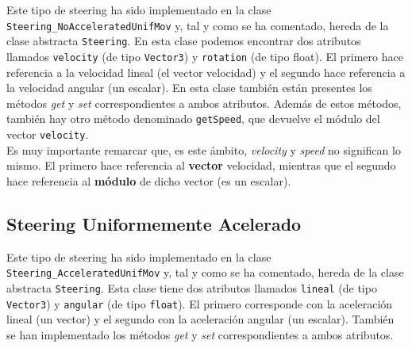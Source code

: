 Este tipo de steering ha sido implementado en la clase \texttt{Steering\_NoAcceleratedUnifMov} y, tal y como se ha comentado, hereda de la clase abstracta \texttt{Steering}. En esta clase podemos encontrar dos atributos llamados \texttt{velocity} (de tipo \texttt{Vector3}) y \texttt{rotation} (de tipo float). El primero hace referencia a la velocidad lineal (el vector velocidad) y el segundo hace referencia a la velocidad angular (un escalar). En esta clase también están presentes los métodos \textit{get} y \textit{set} correspondientes a ambos atributos. Además de estos métodos, también hay otro método denominado \texttt{getSpeed}, que devuelve el módulo del vector \texttt{velocity}. \\

Es muy importante remarcar que, es este ámbito, \textit{velocity} y \textit{speed} no significan lo mismo. El primero hace referencia al \textbf{vector} velocidad, mientras que el segundo hace referencia al \textbf{módulo} de dicho vector (es un escalar).

\subsection{Steering Uniformemente Acelerado}

Este tipo de steering ha sido implementado en la clase \texttt{Steering\_AcceleratedUnifMov} y, tal y como se ha comentado, hereda de la clase abstracta \texttt{Steering}. Esta clase tiene dos atributos llamados \texttt{lineal} (de tipo \texttt{Vector3}) y \texttt{angular} (de tipo \texttt{float}). El primero corresponde con la aceleración lineal (un vector) y el segundo con la aceleración angular (un escalar). También se han implementado los métodos \textit{get} y \textit{set} correspondientes a ambos atributos.